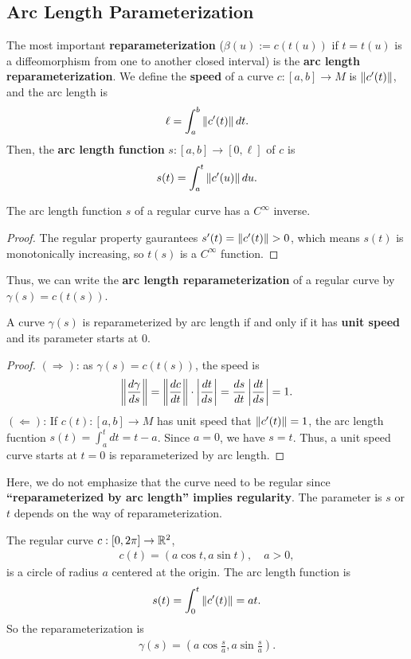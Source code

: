 \subsection{Arc Length Parameterization}
The most important \textbf{reparameterization} ($\beta(u):=c(t(u))$ if $t=t(u)$ 
is a diffeomorphism from one to another closed interval) 
is the \textbf{arc length reparameterization}.
We define the \textbf{speed} of a curve $c: [a,b]\rightarrow M$ is $\left\| c'(t) \right\|$, and the
arc length is
\begin{align}
    \ell = \int_{a}^{b} \left\| c'(t) \right\|dt. \nonumber
\end{align}
Then, the \textbf{arc length function} $s: [a, b] \rightarrow [0, \ell]$ of $c$ is
\begin{align}
    s(t)=\int_{a}^{t} \left\| c'(u) \right\|du. \nonumber
\end{align}
\begin{proposition}
    The arc length function $s$ of a regular curve has a $C^\infty$ inverse.
\end{proposition}
\begin{proof}
    The regular property gaurantees $s'(t)=\left\| c'(t) \right\| > 0$, which means $s(t)$ 
    is monotonically increasing, so $t(s)$ is a $C^\infty$ function.
\end{proof}
Thus, we can write the \textbf{arc length reparameterization} of a regular curve
 by $\gamma(s)=c(t(s))$.
\begin{proposition}
    A curve $\gamma(s)$ is reparameterized by arc length if and only if it has \textbf{unit speed} and
    its parameter starts at $0$.
\end{proposition}
\begin{proof}
    $(\Rightarrow)$: as $\gamma(s)=c(t(s))$, the speed is
    \begin{align}
        \left\| \frac{d\gamma}{ds} \right\| = \left\| \frac{dc}{dt} \right\| \cdot \left|\frac{dt}{ds}\right|
        =\frac{ds}{dt} \left|\frac{dt}{ds}\right|=1.
    \end{align}
$(\Leftarrow)$: If $c(t): [a, b]\rightarrow M$ has unit speed that $\left\| c'(t) \right\|=1$,
 the arc length fucntion $s(t)=\int_{a}^{t}dt=t-a$. Since $a=0$, we have $s=t$. Thus, a unit speed curve
 starts at $t=0$ is reparameterized by arc length.
\end{proof}
Here, we do not emphasize that the curve need to be regular since 
\textbf{``reparameterized by arc length'' implies regularity}. The parameter is $s$ or $t$ depends on the
way of reparameterization.
\begin{example}
    The regular curve $c: [0, 2\pi] \rightarrow {\mathbb{R}}^2$,
    \begin{align}
        c(t)=(a\cos t, a\sin t), \quad a > 0, \nonumber
    \end{align}
    is a circle of radius $a$ centered at the origin. The arc length function is
    \begin{align}
        s(t) = \int_{0}^{t} \left\| c'(t) \right\| = at. \nonumber
    \end{align}
    So the reparameterization is
    \begin{align}
        \gamma(s) = (a \cos \frac{s}{a}, a \sin \frac{s}{a}). \nonumber
    \end{align}
\label{eg. circle}
\end{example}
